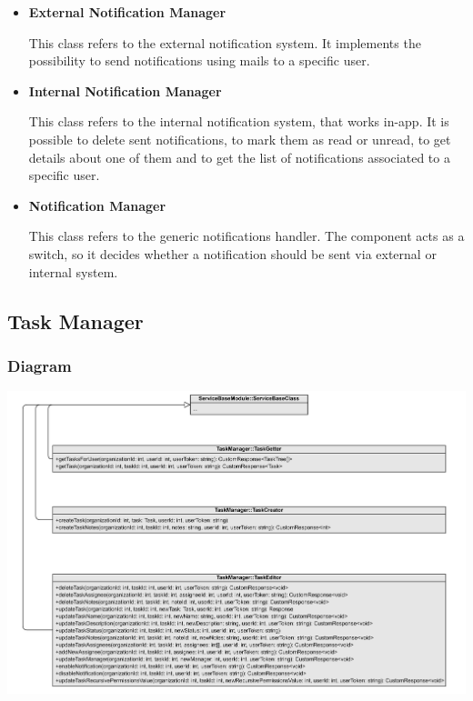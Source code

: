 \documentclass{article}
\begin{document}
\begin{itemize}

\item \textbf{External Notification Manager}

This class refers to the external notification system. It implements the possibility to send notifications using mails to a specific user. 

\item \textbf{Internal Notification Manager}

This class refers to the internal notification system, that works in-app. It is possible to delete sent notifications, to mark them as read or unread, to get details about one of them and to get the list of notifications associated to a specific user.

\item \textbf{Notification Manager}

This class refers to the generic notifications handler. The component acts as a switch, so it decides whether a notification should be sent via external or internal system.
\end{itemize}

\subsection{Task Manager} %
\subsubsection{Diagram}
\includegraphics[width=\textwidth, height=\textheight, keepaspectratio]{images/class_diagram/task_manager.jpg}
\end{document}
